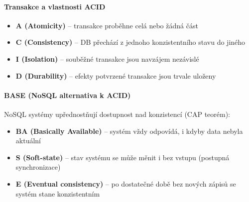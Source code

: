 \paragraph{Transakce a vlastnosti ACID}
\begin{itemize}
  \item \textbf{A (Atomicity)} -- transakce proběhne celá nebo žádná část
  \item \textbf{C (Consistency)} -- DB přechází z jednoho konzistentního stavu do jiného
  \item \textbf{I (Isolation)} -- souběžné transakce jsou navzájem nezávislé
  \item \textbf{D (Durability)} -- efekty potvrzené transakce jsou trvale uloženy
\end{itemize}

\paragraph{BASE (NoSQL alternativa k ACID)}
NoSQL systémy upřednostňují dostupnost nad konzistencí (CAP teorém):
\begin{itemize}
  \item \textbf{BA (Basically Available)} -- systém vždy odpovídá, i kdyby data nebyla aktuální
  \item \textbf{S (Soft-state)} -- stav systému se může měnit i bez vstupu (postupná synchronizace)
  \item \textbf{E (Eventual consistency)} -- po dostatečné době bez nových zápisů se systém stane konzistentním
\end{itemize}

